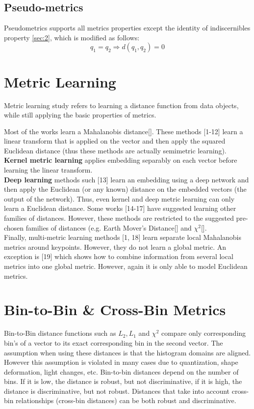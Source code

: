 \subsection{Pseudo-metrics}
Pseudometrics supports all metrics properties except the identity of indiscernibles property \ref{sec:2}, which is modified as follows:
\begin{equation}
q_1 = q_2 \Rightarrow d(q_1,q_2) = 0
\end{equation}


\section{Metric Learning}

Metric learning study refers to learning a distance function from data objects, while still applying the basic properties of metrics.

Most of the works learn a Mahalanobis distance[]. These methods [1-12] learn a linear transform that is applied on the vector and then apply the squared Euclidean distance (thus these methods are actually semimetric learning). 
\\\textbf{Kernel metric learning} applies embedding separably on each vector before learning the linear transform. 
\\\textbf{Deep learning} methods such [13] learn an embedding using a deep network and then apply the Euclidean (or any known) distance on the embedded vectors (the output of the network). 
Thus, even kernel and deep metric learning can only learn a Euclidean distance. Some works [14-17] have suggested learning other families of distances. 
However, these methods are restricted to the suggested pre-chosen families of distances (e.g. Earth Mover’s Distance[] and $\chi^2$[].\\
Finally, multi-metric learning methods [1, 18] learn separate local Mahalanobis metrics around keypoints. However, they do not learn a global metric. An exception is [19] which shows how to combine information from several local metrics into one global metric. However, again it is only able to model Euclidean metrics.




\section{Bin-to-Bin \& Cross-Bin Metrics}
Bin-to-Bin distance functions such as $L_2, L_1$ and $\chi^2$ compare only corresponding bin’s of a vector to its exact corresponding bin in the second vector. The assumption when using these distances is that the histogram domains are aligned. However this assumption is violated in many cases due to quantization, shape deformation, light changes, etc. Bin-to-bin distances depend on the number of bins. If it is low, the distance is robust, but not discriminative, if it is high, the distance is discriminative, but not robust. 
Distances that take into account cross-bin relationships (cross-bin distances) can be both robust and discriminative.


